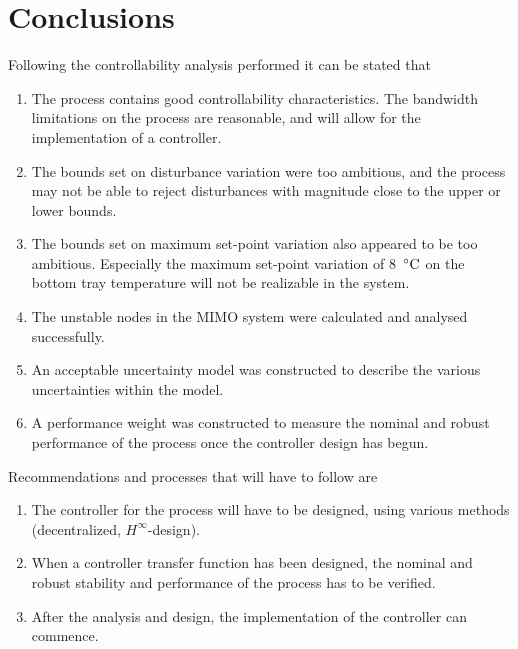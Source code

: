 \section{Conclusions}

Following the controllability analysis performed it can be stated that

\begin{enumerate}
	\item The process contains good controllability characteristics. The bandwidth limitations on the process are reasonable, and will allow for the implementation of a controller.
	\item The bounds set on disturbance variation were too ambitious, and the process may not be able to reject disturbances with magnitude close to the upper or lower bounds.
	\item The bounds set on maximum set-point variation also appeared to be too ambitious. Especially the maximum set-point variation of 8~$\celsius$ on the bottom tray temperature will not be realizable in the system.
	\item The unstable nodes in the MIMO system were calculated and analysed successfully.
	\item An acceptable uncertainty model was constructed to describe the various uncertainties within the model.
	\item A performance weight was constructed to measure the nominal and robust performance of the process once the controller design has begun.
\end{enumerate}

Recommendations and processes that will have to follow are

\begin{enumerate}
	\item The controller for the process will have to be designed, using various methods (decentralized, $H^\infty$-design).
	\item When a controller transfer function has been designed, the nominal and robust stability and performance of the process has to be verified.
	\item After the analysis and design, the implementation of the controller can commence.
\end{enumerate}